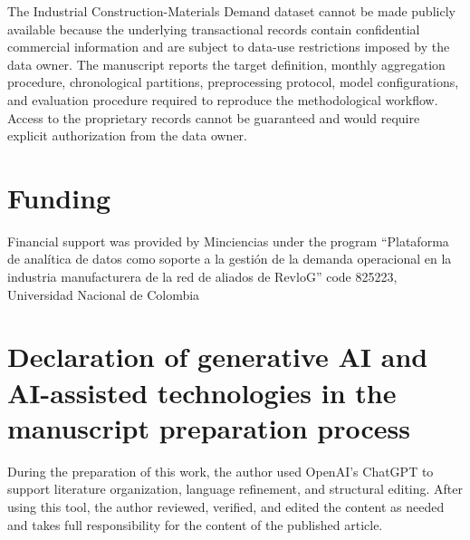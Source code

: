 \documentclass[review,number,sort&compress]{elsarticle}
\begin{document}
The Industrial Construction-Materials Demand dataset cannot be made
publicly available because the underlying transactional records contain
confidential commercial information and are subject to data-use
restrictions imposed by the data owner. The manuscript reports the
target definition, monthly aggregation procedure, chronological
partitions, preprocessing protocol, model configurations, and evaluation
procedure required to reproduce the methodological workflow. Access to
the proprietary records cannot be guaranteed and would require explicit
authorization from the data owner.

\section*{Funding}

Financial support was provided by Minciencias under the program “Plataforma de analítica de datos como soporte a la gestión de la demanda operacional en la industria manufacturera de la red de aliados de RevloG” code 825223, Universidad Nacional de Colombia

\section*{Declaration of generative AI and AI-assisted technologies
in the manuscript preparation process}

During the preparation of this work, the author used OpenAI's ChatGPT
to support literature organization, language refinement, and structural
editing. After using this tool, the author reviewed, verified, and edited
the content as needed and takes full responsibility for the content of
the published article.
\end{document}
